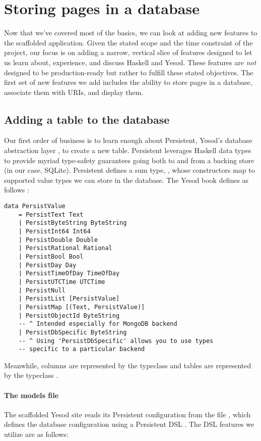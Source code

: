 \section{Storing pages in a database}

Now that we've covered most of the basics, we can look at adding new features to the scaffolded application. Given the stated scope and the time constraint of the project, our focus is on adding a narrow, vertical slice of features designed to let us learn about, experience, and discuss Haskell and Yesod. These features are \emph{not} designed to be production-ready but rather to fulfill these stated objectives. The first set of new features we add includes the ability to store pages in a database, associate them with URIs, and display them.

\subsection{Adding a table to the database}

Our first order of business is to learn enough about Persistent, Yesod's database abstraction layer \cite{ybkPersistent}, to create a new table. Persistent leverages Haskell data types to provide myriad type-safety guarantees going both to and from a backing store (in our case, SQLite). Persistent defines a sum type, , whose constructors map to supported value types we can store in the database. The Yesod book defines  as follows \cite{ybkPersistent}:

\begin{Verbatim}[samepage=true]
data PersistValue
    = PersistText Text
    | PersistByteString ByteString
    | PersistInt64 Int64
    | PersistDouble Double
    | PersistRational Rational
    | PersistBool Bool
    | PersistDay Day
    | PersistTimeOfDay TimeOfDay
    | PersistUTCTime UTCTime
    | PersistNull
    | PersistList [PersistValue]
    | PersistMap [(Text, PersistValue)]
    | PersistObjectId ByteString
    -- ^ Intended especially for MongoDB backend
    | PersistDbSpecific ByteString
    -- ^ Using 'PersistDbSpecific' allows you to use types
    -- specific to a particular backend
\end{Verbatim}

Meanwhile, columns are represented by the  typeclass and tables are represented by the  typeclass \cite{ybkPersistent}.

\paragraph{The models file} The scaffolded Yesod site reads its Persistent configuration from the file , which defines the database configuration using a Persistent DSL \cite{ybkScaffolding}. The DSL features we utilize are as follows:


